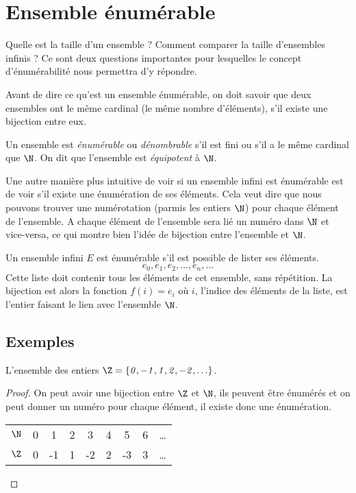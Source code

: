 \section{Ensemble énumérable}
\label{sec:ensemble_num_rables}
Quelle est la taille d'un ensemble ?  Comment comparer la taille d'ensembles infinis ? Ce sont deux questions importantes pour lesquelles le concept d'énumérabilité nous permettra d'y répondre.

Avant de dire ce qu'est un ensemble énumérable, on doit savoir que deux ensembles
ont le même cardinal (le même nombre d'éléments), s'il existe une bijection entre eux.

\begin{mydef}
	Un ensemble est \emph{énumérable} ou \emph{dénombrable} s'il est fini ou s'il a le même cardinal que $\N$. On dit que l'ensemble est \emph{équipotent} à $\N$.
\end{mydef}
Une autre manière plus intuitive de voir si un ensemble infini est énumérable est de voir s'il existe une énumération de ses éléments. Cela veut dire que nous pouvons trouver une numérotation (parmis les entiers $\N$) pour chaque élément de l'ensemble. A chaque élément de l'ensemble sera lié un numéro dans $\N$ et vice-versa, ce qui montre bien l'idée de bijection entre l'ensemble et $\N$.

\begin{myprop}
Un ensemble infini $E$ est énumérable s'il est possible de lister ses éléments.
\[
e_0, e_1, e_2, \ldots , e_n, \ldots
\]
Cette liste doit contenir tous les éléments de cet ensemble, sans répétition.  La bijection est alors la fonction $f(i) = e_i$ où $i$, l'indice des éléments de la liste, est l'entier faisant le lien avec l'ensemble $\N$.
\end{myprop}

\subsection{Exemples}
\label{subsec:exemples}

\begin{myexem}
  L'ensemble des entiers $\mathit{\Z=\{0,-1,1,2,-2,\ldots\}}$.
  \begin{proof}
     On peut avoir une bijection entre $\Z$ et $\N$, ils peuvent être énumérés et on peut donner un numéro pour chaque élément, il existe donc une énumération.

  \begin{tabular}{ l | c c c c c c c r }
     $\N$ & 0 & 1 & 2  & 3 & 4 & 5 & 6 & \ldots \\
     $\Z$ & 0 & -1 & 1 & -2 & 2 & -3 & 3  & \ldots \\

    \end{tabular}
  \end{proof}
\end{myexem}

